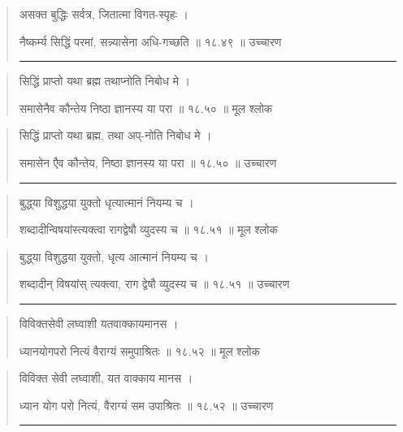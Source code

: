 \begin{quotation}

असक्त बुद्धिः सर्वत्र, जितात्मा विगत-स्पृहः ।  

नैष्कर्म्य सिद्धिं परमां, सन्न्यासेना अधि-गच्छति  ॥ १८.४९ ॥  उच्चारण

\noindent\rule{16cm}{0.4pt} 
\end{quotation}


\begin{quotation}

सिद्धिं प्राप्तो यथा ब्रह्म तथाप्नोति निबोध मे ।  

समासेनैव कौन्तेय निष्ठा ज्ञानस्य या परा  ॥ १८.५० ॥  मूल श्लोक
\end{quotation}

\begin{quotation}

सिद्धिं प्राप्तो यथा ब्रह्म, तथा अप्-नोति निबोध मे ।  

समासेन एैव कौन्तेय, निष्ठा ज्ञानस्य या परा  ॥ १८.५० ॥  उच्चारण

\noindent\rule{16cm}{0.4pt} 
\end{quotation}


\begin{quotation}

बुद्ध्‌या विशुद्धया युक्तो धृत्यात्मानं नियम्य च ।  

शब्दादीन्विषयांस्त्यक्त्वा रागद्वेषौ व्युदस्य च  ॥ १८.५१ ॥  मूल श्लोक
\end{quotation}

\begin{quotation}

बुद्ध्‌या विशुद्धया युक्तो, धृत्य आत्मानं नियम्य च ।  

शब्दादीन् विषयांस् त्यक्त्वा, राग द्वेषौ व्युदस्य च  ॥ १८.५१ ॥  उच्चारण

\noindent\rule{16cm}{0.4pt} 
\end{quotation}


\begin{quotation}

विविक्तसेवी लघ्वाशी यतवाक्कायमानस ।  

ध्यानयोगपरो नित्यं वैराग्यं समुपाश्रितः  ॥ १८.५२ ॥  मूल श्लोक
\end{quotation}

\begin{quotation}

विविक्त सेवी लघ्वाशी, यत वाक्काय मानस ।  

ध्यान योग परो नित्यं, वैराग्यं सम उपाश्रितः  ॥ १८.५२ ॥  उच्चारण

\noindent\rule{16cm}{0.4pt} 
\end{quotation}


